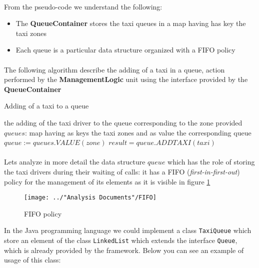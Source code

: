 \paragraph{}From the pseudo-code we understand the following:
\begin{itemize}
	\item The \textbf{QueueContainer} stores the taxi queues in a map having has key the taxi zones
	\item Each queue is a particular data structure organized with a FIFO policy
\end{itemize}
\paragraph{} The following algorithm describe the adding of a taxi in a queue, action performed by the \textbf{ManagementLogic} unit using the interface provided by the \textbf{QueueContainer}
\begin{algorithm}
\caption{Adding of a taxi to a queue}
\begin{algorithmic} \label{alg:addingOfATaxi}
\ENSURE the adding of the taxi driver to the queue corresponding to the zone provided
\linebreak
\STATE $queues$: map having as keys the taxi zones and as value the corresponding queue \linebreak
$queue:= queues.VALUE(zone)$  \linebreak
$result = queue.ADDTAXI(taxi)$ 
\RETURN
\end{algorithmic}
\end{algorithm}
\paragraph{}Lets analyze in more detail the data structure $queue$ which has the role of storing the taxi drivers during their waiting of calls: it has a FIFO (\textit{first-in-first-out}) policy for the management of its elements as it is visible in figure \ref{fig:FIFOpolicy}
\begin{figure}[H]
	\centering
	\texttt{[image: ../"Analysis Documents"/FIFO]}
	\caption{FIFO policy}
	\label{fig:FIFOpolicy}
\end{figure}
In the Java programming language we could implement a class \texttt{TaxiQueue} which store an element of the class \texttt{LinkedList} which extends the interface \texttt{Queue}, which is already provided by the framework. Below you can see an example of usage of this class:

